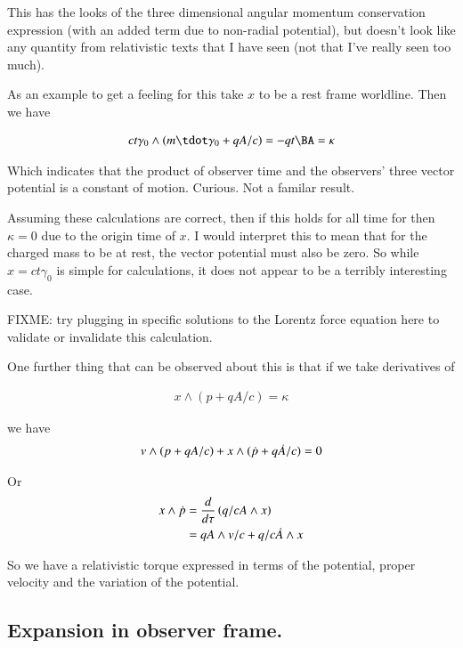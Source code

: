 \documentclass{article}      %
\begin{document}
This has the looks of the three dimensional angular momentum conservation expression (with an added term due to non-radial potential),
but doesn't look like any quantity from relativistic texts that I have seen (not that I've really seen too much).

As an example to get a feeling for this take $x$ to be a rest frame worldline.  Then we have

\begin{align}
c t \gamma_0 \wedge ( m \tdot \gamma_0 + qA/c ) = -q t \BA = \kappa
\end{align}

Which indicates that the product of observer time and the observers' three vector potential is a constant of motion.  Curious.  Not a familar result.

Assuming these calculations are correct, then if this holds for all time for then $\kappa =0$ due to the origin time of $x$.
I would interpret this to mean that for the charged mass to be at rest, the vector potential must also be zero.  So while $x = ct\gamma_0$ 
is simple for calculations, it does not appear to be a terribly interesting case.

FIXME: try plugging in specific solutions to the Lorentz force equation here to validate or invalidate this calculation.

One further thing that can be observed about this is that if we take derivatives of

\begin{align*}
x \wedge (p + qA/c ) = \kappa
\end{align*}

we have
\begin{align*}
v \wedge (p + qA/c ) + x \wedge (\dot{p} + q\dot{A}/c ) = 0
\end{align*}

Or
\begin{align}\label{eqn:noethersLxTx}
x \wedge \dot{p} &= \frac{d}{d\tau} \left( q/c A \wedge x \right) \\
&= qA \wedge v/c + q/c \dot{A} \wedge x 
\end{align}

So we have a relativistic torque expressed in terms of the potential, proper velocity and the variation of the potential.

\subsection{ Expansion in observer frame. } 
\end{document}
